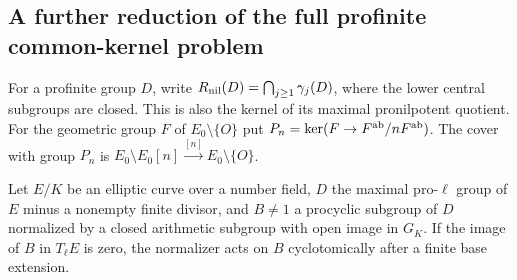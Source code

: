 \subsection{A further reduction of the full profinite common-kernel problem}

For a profinite group $D$, write
$R_{\rm nil}(D)=\bigcap_{j\ge1}\gamma_j(D)$,
where the lower central subgroups are closed.  This is
also the kernel of its maximal pronilpotent quotient.
For the geometric group $F$ of $E_0\setminus\{O\}$
put $P_n=\ker(F\to F^{\rm ab}/nF^{\rm ab})$.
The cover with group $P_n$ is
$E_0\setminus E_0[n]\xrightarrow{[n]}E_0\setminus\{O\}$.

\begin{lemma}
\label{A:isogeny-weight-test}
Let $E/K$ be an elliptic curve over a number field,
$D$ the maximal pro-$\ell$ group of $E$ minus a
nonempty finite divisor, and $B\ne1$ a procyclic
subgroup of $D$ normalized by a closed arithmetic
subgroup with open image in $G_K$.  If the image of
$B$ in $T_\ell E$ is zero, the normalizer acts on
$B$ cyclotomically after a finite base extension.
\end{lemma}
